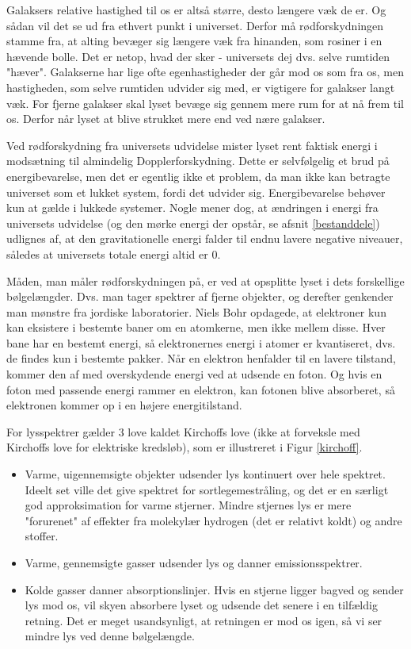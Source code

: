 Galaksers relative hastighed til os er altså større, desto længere væk de er. Og sådan vil det se ud fra ethvert punkt i universet. Derfor må rødforskydningen stamme fra, at alting bevæger sig længere væk fra hinanden, som rosiner i en hævende bolle. Det er netop, hvad der sker - universets dej dvs. selve rumtiden "hæver". Galakserne har lige ofte egenhastigheder der går mod os som fra os, men hastigheden, som selve rumtiden udvider sig med, er vigtigere for galakser langt væk. For fjerne galakser skal lyset bevæge sig gennem mere rum for at nå frem til os. Derfor når lyset at blive strukket mere end ved nære galakser. 

Ved rødforskydning fra universets udvidelse mister lyset rent faktisk energi i modsætning til almindelig Dopplerforskydning. Dette er selvfølgelig et brud på energibevarelse, men det er egentlig ikke et problem, da man ikke kan betragte universet som et lukket system, fordi det udvider sig. Energibevarelse behøver kun at gælde i lukkede systemer. Nogle mener dog, at ændringen i energi fra universets udvidelse (og den mørke energi der opstår, se afsnit \ref{bestanddele}) udlignes af, at den gravitationelle energi falder til endnu lavere negative niveauer, således at universets totale energi altid er 0.

Måden, man måler rødforskydningen på, er ved at opsplitte lyset i dets forskellige bølgelængder. Dvs. man tager spektrer af fjerne objekter, og derefter genkender man mønstre fra jordiske laboratorier. Niels Bohr opdagede, at elektroner kun kan eksistere i bestemte baner om en atomkerne, men ikke mellem disse. Hver bane har en bestemt energi, så elektronernes energi i atomer er kvantiseret, dvs. de findes kun i bestemte pakker. Når en elektron henfalder til en lavere tilstand, kommer den af med overskydende energi ved at udsende en foton. Og hvis en foton med passende energi rammer en elektron, kan fotonen blive absorberet, så elektronen kommer op i en højere energitilstand. 

For lysspektrer gælder 3 love kaldet Kirchoffs love (ikke at forveksle med Kirchoffs love for elektriske kredsløb), som er illustreret i Figur \ref{kirchoff}.
\begin{itemize}
	\item Varme, uigennemsigte objekter udsender lys kontinuert over hele spektret. Ideelt set ville det give spektret for sortlegemestråling, og det er en særligt god approksimation for varme stjerner. Mindre stjernes lys er mere "forurenet" af effekter fra molekylær hydrogen (det er relativt koldt) og andre stoffer.
	\item Varme, gennemsigte gasser udsender lys og danner emissionsspektrer.
	\item Kolde gasser danner absorptionslinjer. Hvis en stjerne ligger bagved og sender lys mod os, vil skyen absorbere lyset og udsende det senere i en tilfældig retning. Det er meget usandsynligt, at retningen er mod os igen, så vi ser mindre lys ved denne bølgelængde.
\end{itemize}

